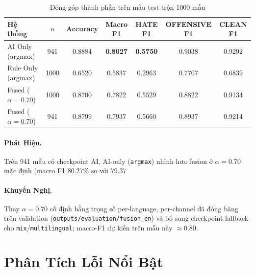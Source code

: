 \documentclass[11pt,a4paper]{article}
\begin{document}
\begin{table}[H]
    \centering
    \caption{Đóng góp thành phần trên mẫu test trộn 1000 mẫu}
    \label{tab:ablation}
    \small
    \begin{tabular}{lcccccc}
        \toprule
        Hệ thống              & $n$  & Accuracy & Macro F1        & HATE F1         & OFFENSIVE F1 & CLEAN F1 \\
        \midrule
        AI Only (argmax)      & 941  & 0.8884   & \textbf{0.8027} & \textbf{0.5750} & 0.9038       & 0.9292   \\
        Rule Only (argmax)    & 1000 & 0.6520   & 0.5837          & 0.2963          & 0.7707       & 0.6839   \\
        Fused ($\alpha=0.70$) & 1000 & 0.8700   & 0.7822          & 0.5529          & 0.8822       & 0.9134   \\
        Fused ($\alpha=0.70$) & 941  & 0.8799   & 0.7937          & 0.5660          & 0.8937       & 0.9214   \\
        \bottomrule
    \end{tabular}
\end{table}

\paragraph{Phát Hiện.} Trên 941 mẫu có checkpoint AI, AI-only (\texttt{argmax}) nhỉnh hơn fusion ở
$\alpha=0.70$ mặc định (macro F1 80.27\% so với 79.37%

\paragraph{Khuyến Nghị.} Thay $\alpha=0.70$ cố định bằng trọng số per-language, per-channel đã đóng băng
trên validation (\texttt{outputs/evaluation/fusion\_en}) và bổ sung checkpoint
fallback cho \texttt{mix}/\texttt{multilingual}; macro-F1 dự kiến trên mẫu này
$\approx 0.80$.

\section{Phân Tích Lỗi Nổi Bật}
\end{document}
